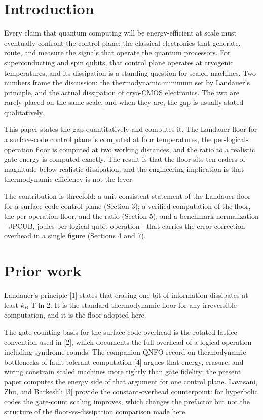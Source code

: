 \documentclass[11pt]{article}
\begin{document}
\section{Introduction}
Every claim that quantum computing will be energy-efficient at scale must eventually confront the control plane: the classical electronics that generate, route, and measure the signals that operate the quantum processors. For superconducting and spin qubits, that control plane operates at cryogenic temperatures, and its dissipation is a standing question for scaled machines. Two numbers frame the discussion: the thermodynamic minimum set by Landauer's principle, and the actual dissipation of cryo-CMOS electronics. The two are rarely placed on the same scale, and when they are, the gap is usually stated qualitatively.

This paper states the gap quantitatively and computes it. The Landauer floor for a surface-code control plane is computed at four temperatures, the per-logical-operation floor is computed at two working distances, and the ratio to a realistic gate energy is computed exactly. The result is that the floor sits ten orders of magnitude below realistic dissipation, and the engineering implication is that thermodynamic efficiency is not the lever.

The contribution is threefold: a unit-consistent statement of the Landauer floor for a surface-code control plane (Section 3); a verified computation of the floor, the per-operation floor, and the ratio (Section 5); and a benchmark normalization - JPCUB, joules per logical-qubit operation - that carries the error-correction overhead in a single figure (Sections 4 and 7).

\section{Prior work}
Landauer's principle [1] states that erasing one bit of information dissipates at least $k_{B}$ T ln 2. It is the standard thermodynamic floor for any irreversible computation, and it is the floor adopted here.

The gate-counting basis for the surface-code overhead is the rotated-lattice convention used in [2], which documents the full overhead of a logical operation including syndrome rounds. The companion QNFO record on thermodynamic bottlenecks of fault-tolerant computation [4] argues that energy, erasure, and wiring constrain scaled machines more tightly than gate fidelity; the present paper computes the energy side of that argument for one control plane. Lavasani, Zhu, and Barkeshli [3] provide the constant-overhead counterpoint: for hyperbolic codes the gate-count scaling improves, which changes the prefactor but not the structure of the floor-vs-dissipation comparison made here.
\end{document}

